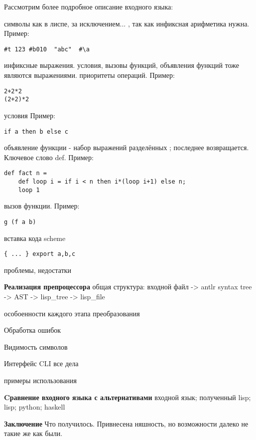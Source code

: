 \documentclass[12pt,a4paper,oneside]{extarticle}
\begin{document}
Рассмотрим более подробное описание входного языка:
    
    символы как в лиспе, за исключением... , так как инфиксная арифметика нужна. Пример:
    \begin{lstlisting}[mathescape] 
#t 123 #b010  "abc"  #\a  
    \end{lstlisting}

    инфиксные выражения. условия, вызовы функций, объявления функций тоже являются выражениями. приоритеты операций. Пример:
    \begin{lstlisting}[mathescape] 
2+2*2
(2+2)*2
    \end{lstlisting}
    

    условия Пример:
    \begin{lstlisting}[mathescape] 
if a then b else c
    \end{lstlisting}
     
    объявление функции - набор выражений разделённых ; последнее возвращается. Ключевое слово def. Пример:
    \begin{lstlisting}[mathescape] 
def fact n =
    def loop i = if i < n then i*(loop i+1) else n;
    loop 1
    \end{lstlisting}

    вызов функции. Пример:
    \begin{lstlisting}[mathescape] 
g (f a b)
    \end{lstlisting}

    вставка кода scheme 
    \begin{lstlisting}[mathescape] 
        { ... } export a,b,c
    \end{lstlisting}

    проблемы, недостатки

\noindent\textbf{Реализация препроцессора}
        общая структура: входной файл -> antlr syntax tree -> AST -> lisp_tree -> lisp_file

        особоенности каждого этапа преобразования

        Обработка ошибок

        Видимость символов
        
    Интерфейс
        CLI все дела

        примеры использования

\noindent\textbf{Cравнение входного языка с альтернативами}
входной язык; полученный lisp; lisp; python; haskell

\noindent\textbf{Заключение}
    Что получилось. Привнесена няшность, но возможности далеко не такие же как были.
\end{document}
